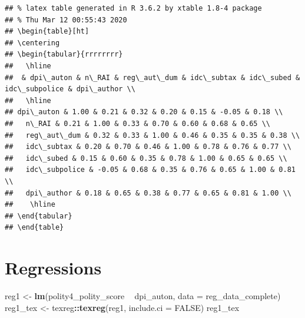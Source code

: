 \documentclass[
]{article}
\newenvironment{Shaded}{\begin{snugshade}}{\end{snugshade}}
\newcommand{\DataTypeTok}[1]{\textcolor[rgb]{0.13,0.29,0.53}{#1}}
\newcommand{\KeywordTok}[1]{\textcolor[rgb]{0.13,0.29,0.53}{\textbf{#1}}}
\newcommand{\NormalTok}[1]{#1}
\newcommand{\OperatorTok}[1]{\textcolor[rgb]{0.81,0.36,0.00}{\textbf{#1}}}
\newcommand{\OtherTok}[1]{\textcolor[rgb]{0.56,0.35,0.01}{#1}}
\newcommand{\StringTok}[1]{\textcolor[rgb]{0.31,0.60,0.02}{#1}}
\begin{document}
\begin{verbatim}
## % latex table generated in R 3.6.2 by xtable 1.8-4 package
## % Thu Mar 12 00:55:43 2020
## \begin{table}[ht]
## \centering
## \begin{tabular}{rrrrrrrr}
##   \hline
##  & dpi\_auton & n\_RAI & reg\_aut\_dum & idc\_subtax & idc\_subed & idc\_subpolice & dpi\_author \\ 
##   \hline
## dpi\_auton & 1.00 & 0.21 & 0.32 & 0.20 & 0.15 & -0.05 & 0.18 \\ 
##   n\_RAI & 0.21 & 1.00 & 0.33 & 0.70 & 0.60 & 0.68 & 0.65 \\ 
##   reg\_aut\_dum & 0.32 & 0.33 & 1.00 & 0.46 & 0.35 & 0.35 & 0.38 \\ 
##   idc\_subtax & 0.20 & 0.70 & 0.46 & 1.00 & 0.78 & 0.76 & 0.77 \\ 
##   idc\_subed & 0.15 & 0.60 & 0.35 & 0.78 & 1.00 & 0.65 & 0.65 \\ 
##   idc\_subpolice & -0.05 & 0.68 & 0.35 & 0.76 & 0.65 & 1.00 & 0.81 \\ 
##   dpi\_author & 0.18 & 0.65 & 0.38 & 0.77 & 0.65 & 0.81 & 1.00 \\ 
##    \hline
## \end{tabular}
## \end{table}
\end{verbatim}

\hypertarget{regressions}{%
\section{Regressions}\label{regressions}}

\begin{Shaded}
\begin{Highlighting}[]
\NormalTok{reg1 <-}\StringTok{ }\KeywordTok{lm}\NormalTok{(polity4_polity_score }\OperatorTok{~}\StringTok{ }\NormalTok{dpi_auton, }\DataTypeTok{data =}\NormalTok{ reg_data_complete)}
\NormalTok{reg1_tex <-}\StringTok{ }\NormalTok{texreg}\OperatorTok{::}\KeywordTok{texreg}\NormalTok{(reg1, }\DataTypeTok{include.ci =} \OtherTok{FALSE}\NormalTok{)}
\NormalTok{reg1_tex}
\end{Highlighting}
\end{Shaded}
\end{document}
